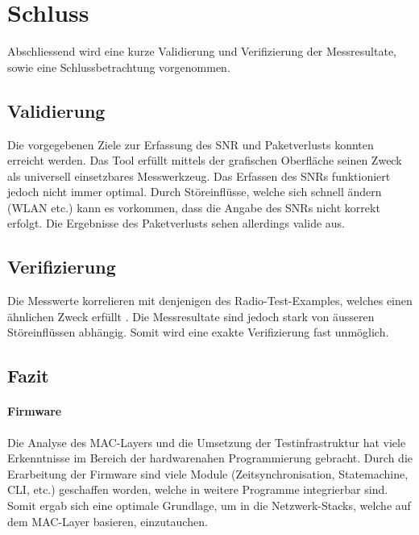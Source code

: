 \newpage
\section{Schluss}\label{sec:SchlussP2P}

Abschliessend wird eine kurze Validierung und Verifizierung der Messresultate, sowie eine Schlussbetrachtung vorgenommen.

\subsection{Validierung}\label{subsec:P2PValidierung}
Die vorgegebenen Ziele zur Erfassung des SNR und Paketverlusts konnten erreicht werden.
Das Tool erfüllt mittels der grafischen Oberfläche seinen Zweck als universell einsetzbares Messwerkzeug.
Das Erfassen des SNRs funktioniert jedoch nicht immer optimal.
Durch Störeinflüsse, welche sich schnell ändern (WLAN etc.) kann es vorkommen, dass die Angabe des SNRs nicht korrekt erfolgt.
Die Ergebnisse des Paketverlusts sehen allerdings valide aus. 


\subsection{Verifizierung}\label{subsec:P2PVerifizierung}
Die Messwerte korrelieren mit denjenigen des Radio-Test-Examples, welches einen ähnlichen Zweck erfüllt \cite{nrf_connect_sdk_radio_test_example_2020}.
Die Messresultate sind jedoch stark von äusseren Störeinflüssen abhängig. Somit wird eine exakte Verifizierung fast unmöglich.



\subsection{Fazit}\label{subsec:FazitP2P}
\paragraph{Firmware}
Die Analyse des MAC-Layers und die Umsetzung der Testinfrastruktur hat viele Erkenntnisse im Bereich der hardwarenahen Programmierung gebracht. Durch die Erarbeitung der Firmware sind viele Module (Zeitsynchronisation, Statemachine, CLI, etc.) geschaffen worden, welche in weitere Programme integrierbar sind. Somit ergab sich eine optimale Grundlage, um in die Netzwerk-Stacks, welche auf dem MAC-Layer basieren, einzutauchen.

